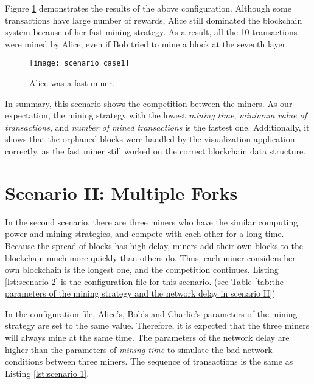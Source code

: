 Figure \ref{fig:alice was a fast miner} demonstrates the results of the above configuration. Although some transactions have large number of rewards, Alice still dominated the blockchain system because of her fast mining strategy. As a result, all the 10 transactions were mined by Alice, even if Bob tried to mine a block at the seventh layer. 

\begin{figure}[htb]
    \centering
    \texttt{[image: scenario\_case1]}
    \caption{Alice was a fast miner.}
    \label{fig:alice was a fast miner}
\end{figure}

\clearpage

In summary, this scenario shows the competition between the miners. As our expectation, the mining strategy with the lowest \textit{mining time}, \textit{minimum value of transactions}, and \textit{number of mined transactions} is the fastest one. Additionally, it shows that the orphaned blocks were handled by the visualization application correctly, as the fast miner still worked on the correct blockchain data structure.

\section{Scenario II: Multiple Forks}

In the second scenario, there are three miners who have the similar computing power and mining strategies, and compete with each other for a long time. Because the spread of blocks has high delay, miners add their own blocks to the blockchain much more quickly than others do. Thus, each miner considers her own blockchain is the longest one, and the competition continues. Listing \ref{lst:scenario 2} is the configuration file for this scenario. (see Table \ref{tab:the parameters of the mining strategy and the network delay in scenario II})

In the configuration file, Alice's, Bob's and Charlie's parameters of the mining strategy are set to the same value. Therefore, it is expected that the three miners will always mine at the same time. The parameters of the network delay are higher than the parameters of \textit{mining time} to simulate the bad network conditions between three miners. The sequence of transactions is the same as Listing \ref{lst:scenario 1}.


